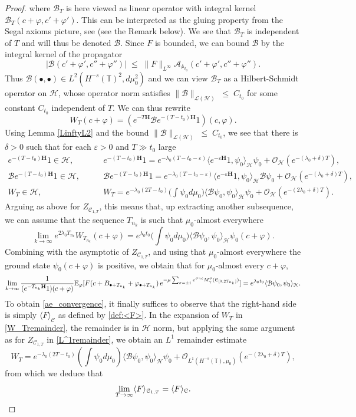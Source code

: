 \documentclass[11pt]{amsart}
\numberwithin{equation}{section}
\theoremstyle{definition}
\renewcommand{\leq}{\;\leqslant\;}                   %
\newcommand{\A}{\mathbb{A}}
\renewcommand{\H}{\mathbb{H}}
\newcommand{\cjd}{\rangle}
\newcommand{\cjg}{\langle}
\def\H{\mathbf{H}}
\def\E{\mathbb{E}}
\newcommand{\mc}{\mathcal}
\newcommand{\la}{\lambda}
\def\eps{\varepsilon}
\def\T{\mathbb{T}}
\begin{document}
\begin{proof}
where $\mc{B}_T$ is here viewed as linear operator with integral kernel $\mc{B}_T(c+\varphi,c'+\varphi')$. This can be interpreted as the gluing property from the Segal axioms picture, see \cite[Proposition 5.1]{GKRV21_Segal} (see the Remark below).
We see that $\mc{B}_T$ is independent of $T$ and will thus be denoted $\mc{B}$. Since $F$ is bounded, we can bound $\mc{B}$ by the integral kernel of the propagator
\[ |\mc{B}(c'+\varphi',c''+\varphi'')|\leq \|F\|_{L^\infty}\mc{A}_{\A_{t_0}}(c'+\varphi',c''+\varphi'').\]
Thus $\mc{B}(\bullet,\bullet)\in L^2(H^{-s}(\T)^2,d\mu_0^2)$ and we can view $\mc{B}_T$ as a Hilbert-Schmidt operator on $\mc{H}$, whose operator norm satisfies $\|\mc{B}\|_{\mc{L}(\mc{H})}\leq C_{t_0}$ for some constant $C_{t_0}$ independent of $T$.
We can thus rewrite 
\[ W_T(c+\varphi)= (e^{-T\H} \mc{B}e^{-(T-t_0)\H}1)(c,\varphi).\]
Using Lemma \ref{LinftyL2} and the bound $\|\mc{B}\|_{\mc{L}(\mc{H})}\leq C_{t_0}$,  we see that there is $\delta>0$ such that for each $\eps>0$ and $T\gg t_0$ large 
\begin{align}
e^{-(T-t_0)\H}1\in \mc{H}, &\qquad  e^{-(T-t_0)\H}1= e^{-\la_0(T-t_0-\eps)}\cjg e^{-\eps \H}1,\psi_0\cjd_{\mc{H}}\psi_0+
\mc{O}_{\mc{H}}(e^{-(\la_0+\delta)T}),	
\\
\mc{B}e^{-(T-t_0)\H}1\in \mc{H}, &\qquad \mc{B}e^{-(T-t_0)\H}1= e^{-\la_0(T-t_0-\eps)}\cjg e^{-\eps \H}1,\psi_0\cjd_{\mc{H}} \mc{B}\psi_0+\mc{O}_{\mc{H}}(e^{-(\la_0+\delta)T}),
\\
W_T\in \mc{H}, &\qquad W_T=e^{-\la_0(2T-t_0)}\Big( \int \psi_0d\mu_0\Big) \cjg \mc{B}\psi_0,\psi_0\cjd_{\mc{H}}\psi_0+\mc{O}_{\mc{H}}(e^{-(2\la_0+\delta)T}).\label{W_Tremainder}
\end{align}
Arguing as above for $Z_{\mc{C}_{1,T}}$, this means that, up extracting another subsequence, we can assume that the sequence $T_{n_k}$ is such that  $\mu_0$-almost everywhere 
\[ \lim_{k\to \infty}e^{2\la_0T_{n_k}}W_{T_{n_k}}(c+\varphi)=e^{\la_0t_0}\Big( \int \psi_0 d\mu_0\Big)\cjg \mc{B}\psi_0,\psi_0\cjd_{\mc{H}}\psi_0(c+\varphi).\]
Combining with the asymptotic of $Z_{\mc{C}_{1,T}}$, and using that $\mu_0$-almost everywhere the ground state  $\psi_0(c+\varphi)$ is positive, we obtain that for $\mu_0$-almost every $c+\varphi$, 
\[\lim_{k\to \infty} \frac{1}{(e^{-T_{n_k}{\bf H}}1)(c+\varphi)}  \E_\varphi[F (c+B_{\bullet+T_{n_k}}+\varphi_{\bullet+T_{n_k}}) \,   e^{- \mu\sum_{\sigma = \pm 1} 
e^{\sigma\gamma c} M_\gamma^\sigma(\mc{C}_{[0,2T_{n_k}]})}]
=e^{\la_0t_0} \cjg \mc{B}\psi_0,\psi_0\cjd_{\mc{H}}.\]
To obtain \eqref{ae_convergence}, it finally suffices to observe that the right-hand side is simply $\cjg F\cjd_{\mc{C}}$ as defined by \eqref{def:<F>}.
In the expansion of $W_T$ in \eqref{W_Tremainder}, the remainder is in $\mc{H}$ norm, but applying the same argument as for $Z_{\mc{C}_{1,T}}$ in \eqref{L^1remainder}, we obtain an $L^1$ remainder estimate
\[ W_T=e^{-\la_0(2T-t_0)}( \int \psi_0d\mu_0) \cjg \mc{B}\psi_0,\psi_0\cjd_{\mc{H}}\psi_0+\mc{O}_{L^1(H^{-s}(\T),\mu_0)}(e^{-(2\la_0+\delta)T}),\]
from which we deduce that 
\[\lim_{T\to \infty}\cjg F\cjd_{\mc{C}_{1,T}}=\cjg F\cjd_{\mc{C}}.\qedhere\]
\end{proof}
\end{document}
